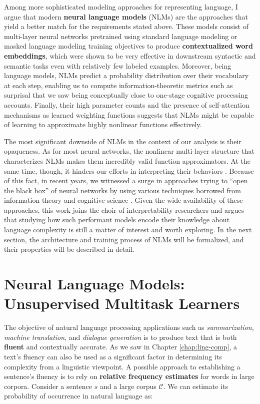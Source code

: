 \documentclass[a4paper, nobind]{templates/ociamthesis}
\begin{document}
Among more sophisticated modeling approaches for representing language, I argue that modern \textbf{neural language models} (NLMs) are the approaches that yield a better match for the requirements stated above. These models consist of multi-layer neural networks \autocite{goodfellow-etal-2016-deep} pretrained using standard language modeling or masked language modeling training objectives to produce \textbf{contextualized word embeddings}, which were shown to be very effective in downstream syntactic and semantic tasks \autocite{peters-etal-2018-deep} even with relatively few labeled examples. Moreover, being language models, NLMs predict a probability distribution over their vocabulary at each step, enabling us to compute information-theoretic metrics such as surprisal that we saw being conceptually close to one-stage cognitive processing accounts. Finally, their high parameter counts and the presence of self-attention mechanisms \autocites{bahdanau-etal-2015-neural}{vaswani-etal-2017-attention} as learned weighting functions suggests that NLMs might be capable of learning to approximate highly nonlinear functions effectively.

The most significant downside of NLMs in the context of our analysis is their opaqueness. As for most neural networks, the nonlinear multi-layer structure that characterizes NLMs makes them incredibly valid function approximators. At the same time, though, it hinders our efforts in interpreting their behaviors \autocite{samek-etal-2019-explainable}. Because of this fact, in recent years, we witnessed a surge in approaches trying to ``open the black box'' of neural networks by using various techniques borrowed from information theory \autocite{shwartz-tishby-2017-opening} and cognitive science \autocite{kriegeskorte-etal-2008-representational}. Given the wide availability of these approaches, this work joins the choir of interpretability researchers and argues that studying how such performant models encode their knowledge about language complexity is still a matter of interest and worth exploring. In the next section, the architecture and training process of NLMs will be formalized, and their properties will be described in detail.

\hypertarget{subchap:nlm}{%
\section{Neural Language Models: Unsupervised Multitask Learners}\label{subchap:nlm}}

The objective of natural language processing applications such as \emph{summarization}, \emph{machine translation}, and \emph{dialogue generation} is to produce text that is both \textbf{fluent} and contextually accurate. As we saw in Chapter \ref{chap:ling-comp}, a text's fluency can also be used as a significant factor in determining its complexity from a linguistic viewpoint. A possible approach to establishing a sentence's fluency is to rely on \textbf{relative frequency estimates} for words in large corpora. Consider a sentence \(s\) and a large corpus \(\mathcal{C}\). We can estimate its probability of occurrence in natural language as:
\end{document}

